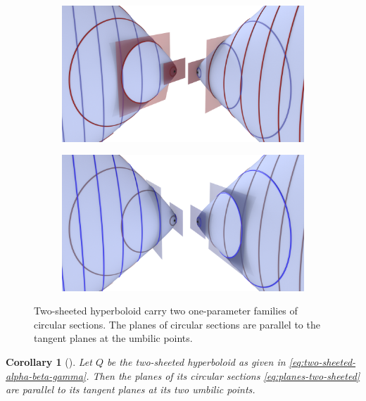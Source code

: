 \documentclass[10pt, a4paper]{article}
\theoremstyle{BoldTopSpacing}
\theoremstyle{BoldTopSpacing}
\theoremstyle{BoldTopSpacing}
\newtheorem{corollary}{Corollary}[theorem]
\theoremstyle{BoldTopBottomSpacing}
\theoremstyle{BoldTopSpacing}
\theoremstyle{BoldTopBottomSpacing}
\theoremstyle{remark}
\begin{document}
\begin{figure}[H]
  \begin{subfigure}[b]{0.5\textwidth}
    \includegraphics[width=\textwidth]{umbilics_two_sheeted_hyperboloid_red.png}
    \label{fig:two_sheeted_red}
  \end{subfigure}
  \hfill
  \begin{subfigure}[b]{0.5\textwidth}
    \includegraphics[width=\textwidth]{umbilics_two_sheeted_hyperboloid_blue.png}
    \label{fig:two_sheeted_blue}
  \end{subfigure}
  \caption{Two-sheeted hyperboloid carry two one-parameter families of circular sections. The planes of circular sections are parallel to the tangent planes at the umbilic points.}
\end{figure}

\begin{corollary}[]
\label{col:planes-parallel-umbilic-points}
Let $Q$ be the two-sheeted hyperboloid as given in \eqref{eq:two-sheeted-alpha-beta-gamma}. Then the planes of its circular sections \eqref{eq:planes-two-sheeted} are parallel to its tangent planes at its two umbilic points.
\end{corollary}
\end{document}
